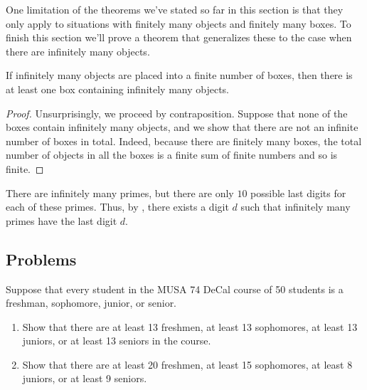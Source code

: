 \documentclass[../notes.tex]{subfiles}
\begin{document}
One limitation of the theorems we've stated so far in this section is that they only apply to situations with finitely many objects and finitely many boxes. To finish this section we'll prove a theorem that generalizes these to the case when there are infinitely many objects.
\begin{theorem} \label{thm:inf-pigenhole}
    If infinitely many objects are placed into a finite number of boxes, then there is at least one box containing infinitely many objects.
\end{theorem}
\begin{proof}
    Unsurprisingly, we proceed by contraposition. Suppose that none of the boxes contain infinitely many objects, and we show that there are not an infinite number of boxes in total. Indeed, because there are finitely many boxes, the total number of objects in all the boxes is a finite sum of finite numbers and so is finite.
\end{proof}
\begin{example}
    There are infinitely many primes, but there are only $10$ possible last digits for each of these primes. Thus, by , there exists a digit $d$ such that infinitely many primes have the last digit $d$.
\end{example}

\subsection{Problems}
\begin{homework}
    Suppose that every student in the MUSA 74 DeCal course of 50 students is a freshman, sophomore, junior, or senior. 
    \begin{enumerate}[label=(\alph*)]
        \item Show that there are at least 13 freshmen, at least 13 sophomores, at least 13 juniors, or at least 13 seniors in the course.
        \item Show that there are at least 20 freshmen, at least 15 sophomores, at least 8 juniors, or at least 9 seniors.  
    \end{enumerate}
\end{homework}
\end{document}
